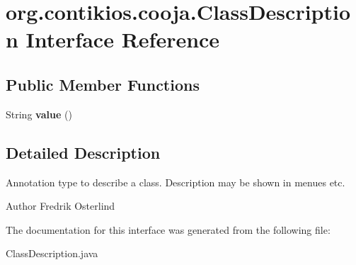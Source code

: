\hypertarget{interfaceorg_1_1contikios_1_1cooja_1_1ClassDescription}{\section{org.\-contikios.\-cooja.\-Class\-Description Interface Reference}
\label{interfaceorg_1_1contikios_1_1cooja_1_1ClassDescription}
}
\subsection*{Public Member Functions}
\begin{DoxyCompactItemize}
\item 
\hypertarget{interfaceorg_1_1contikios_1_1cooja_1_1ClassDescription_af1a93ff07a8d6a1a7414613c4ec389d9}{String {\bfseries value} ()}\label{interfaceorg_1_1contikios_1_1cooja_1_1ClassDescription_af1a93ff07a8d6a1a7414613c4ec389d9}

\end{DoxyCompactItemize}


\subsection{Detailed Description}
Annotation type to describe a class. Description may be shown in menues etc.

\begin{DoxyAuthor}{Author}
Fredrik Osterlind 
\end{DoxyAuthor}


The documentation for this interface was generated from the following file\-:\begin{DoxyCompactItemize}
\item 
Class\-Description.\-java\end{DoxyCompactItemize}
